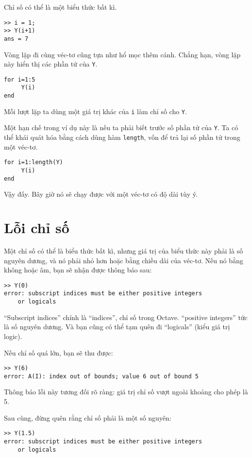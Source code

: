 \documentclass[12pt]{book}
\begin{document}
Chỉ số có thể là một biểu thức bất kì.

\begin{verbatim}
>> i = 1;
>> Y(i+1)
ans = 7
\end{verbatim}
%
Vòng lặp đi cùng véc-tơ cũng tựa như hổ mọc thêm cánh.
Chẳng hạn, vòng lặp này hiển thị các phần tử của {\tt Y}.

\begin{verbatim}
for i=1:5
     Y(i)
end
\end{verbatim}
%
Mỗi lượt lặp ta dùng một giá trị khác của {\tt i} làm chỉ số
cho {\tt Y}.

Một hạn chế trong ví dụ này là nếu ta phải biết trước số
phần tử của {\tt Y}. Ta có thể khái quát hóa bằng cách dùng
hàm {\tt length}, vốn để trả lại số phần tử trong một véc-tơ.

\begin{verbatim}
for i=1:length(Y)
     Y(i)
end
\end{verbatim}
%
Vậy đấy. Bây giờ nó sẽ chạy được với một véc-tơ có độ dài tùy ý.


\section{Lỗi chỉ số}

Một chỉ số có thể là biểu thức bất kì, nhưng giá trị của 
biểu thức này phải là số nguyên dương, và nó phải nhỏ hơn
hoặc bằng chiều dài của véc-tơ. Nếu nó bằng không hoặc âm,
bạn sẽ nhận được thông báo sau:

\begin{verbatim}
>> Y(0)
error: subscript indices must be either positive integers
	or logicals
\end{verbatim}
%
``Subscript indices'' chính là ``indices'', chỉ số trong Octave.
``positive integers'' tức là số nguyên dương. Và bạn cũng có thể 
tạm quên đi ``logicals'' (kiểu giá trị logic).

Nếu chỉ số quá lớn, bạn sẽ thu được:

\begin{verbatim}
>> Y(6)
error: A(I): index out of bounds; value 6 out of bound 5
\end{verbatim}
%
Thông báo lỗi này tương đối rõ ràng: giá trị chỉ số vượt ngoài  khoảng
cho phép là 5.

Sau cùng, đừng quên rằng chỉ số phải là một số nguyên:

\begin{verbatim}
>> Y(1.5)
error: subscript indices must be either positive integers
	or logicals
\end{verbatim}
\end{document}
